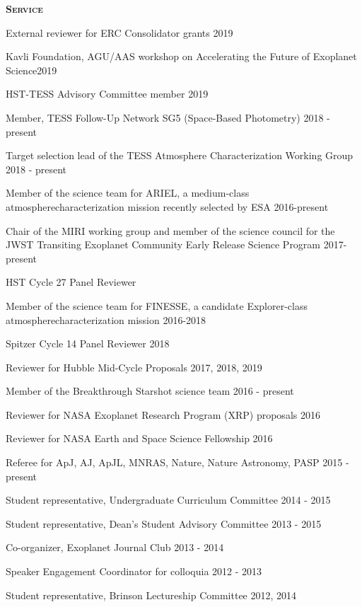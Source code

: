 \documentclass[12pt,letterpaper]{article}
\begin{document}
\vspace{3mm}
\textbf{\textsc{Service}} 
\begin{compactitem}[]
\item {External reviewer for ERC Consolidator grants \hfill 2019}
\item {Kavli Foundation, AGU/AAS workshop on Accelerating the Future of Exoplanet Science\hfill 2019}
\item {HST-TESS Advisory Committee member \hfill 2019}
\item {Member, TESS Follow-Up Network SG5 (Space-Based Photometry) \hfill 2018 - present}
\item {Target selection lead of the TESS Atmosphere Characterization Working Group \hfill 2018 - present}	
\item {Member of the science team for ARIEL, a medium-class atmosphere\newline characterization mission recently selected by ESA \hfill 2016-present}
\item {Chair of the MIRI working group and member of the science council for the \newline JWST Transiting Exoplanet Community Early Release Science Program \hfill 2017- present}
\item{HST Cycle 27 Panel Reviewer}
\item {Member of the science team for FINESSE, a candidate Explorer-class atmosphere\newline characterization mission \hfill 2016-2018}
\item {Spitzer Cycle 14 Panel Reviewer \hfill 2018}
\item {Reviewer for Hubble Mid-Cycle Proposals \hfill 2017, 2018, 2019}
\item {Member of the Breakthrough Starshot science team \hfill 2016 - present}
\item Reviewer for NASA Exoplanet Research Program (XRP) proposals \hfill	2016
\item Reviewer for NASA Earth and Space Science Fellowship \hfill 2016
\item Referee for ApJ, AJ, ApJL, MNRAS, Nature, Nature Astronomy, PASP \hfill 2015 - present
\item Student representative, Undergraduate Curriculum Committee \hfill 2014 - 2015
\item Student representative, Dean's Student Advisory Committee \hfill 2013 - 2015
\item Co-organizer, Exoplanet Journal Club \hfill 2013 - 2014
\item Speaker Engagement Coordinator for colloquia \hfill 2012 - 2013
\item Student representative, Brinson Lectureship Committee \hfill 2012, 2014
\end{compactitem}
\end{document}
